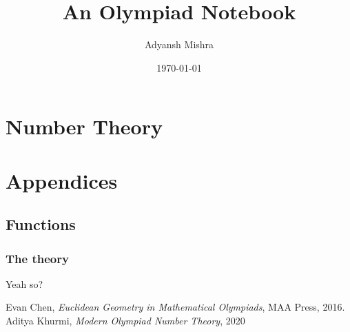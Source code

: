 \documentclass[twoside, a4paper, 10pt, bibliography=totoc, index=totoc, listof=totoc, openany]{scrbook}
\begin{document}
    \author{Adyansh Mishra}
    \date{\today}
    \title{An Olympiad Notebook}
    \fncytitle

    \tableofcontents
     
    \frontmatter
    

    \mainmatter 
    \part{Number Theory}
    
    
    
    \appendix
    
    \part{Appendices}
    
    \chapter{Functions}
    \section{The theory}
    Yeah so?
    
    \backmatter
    \printindex
    \begin{thebibliography}{5}

          Evan Chen,
          \textit{Euclidean Geometry in Mathematical Olympiads},
          MAA Press,
          2016.
            Aditya Khurmi,
            \emph{Modern Olympiad Number Theory},
            2020
    \end{thebibliography}
\end{document}
